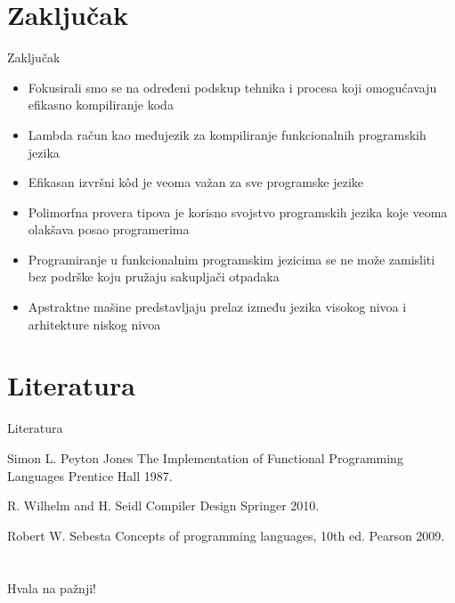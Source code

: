 \documentclass[xcolor={dvipsnames}, 11pt]{beamer}
\begin{document}

\section{Zaključak}
\begin{frame}{Zaključak}
	\begin{itemize}
		\item Fokusirali smo se na određeni podskup tehnika i procesa koji omogućavaju efikasno
		kompiliranje koda
		\item Lambda račun kao međujezik za kompiliranje funkcionalnih programskih jezika
		\item Efikasan izvršni k\^ od je veoma važan za sve programske jezike
		\item Polimorfna provera tipova je korisno svojstvo programskih jezika koje veoma olakšava posao programerima
		\item Programiranje u funkcionalnim programskim jezicima se ne može zamisliti bez podrške koju pružaju sakupljači otpadaka 
		\item Apstraktne mašine predstavljaju prelaz između jezika visokog nivoa i arhitekture niskog nivoa
	\end{itemize}
\end{frame}


\section{Literatura}
\begin{frame}{Literatura}
	
	\begin{thebibliography}{10}
		
		\beamertemplatearticlebibitems
		\bibitem{}
			Simon L. Peyton Jones
			\newblock The Implementation of Functional Programming Languages	
			\newblock Prentice Hall 1987.
		
		\beamertemplatearticlebibitems
		\bibitem{}
			R. Wilhelm and H. Seidl
			\newblock Compiler Design
			\newblock Springer 2010.
		
		\beamertemplatearticlebibitems
		\bibitem{}
			Robert W. Sebesta 
			\newblock Concepts of programming languages, 10th ed.
			\newblock Pearson 2009.
			
	\end{thebibliography}
\end{frame}

\section{}
\begin{frame}
	\centering \Large Hvala na pažnji!
\end{frame}
	
	
\end{document}
